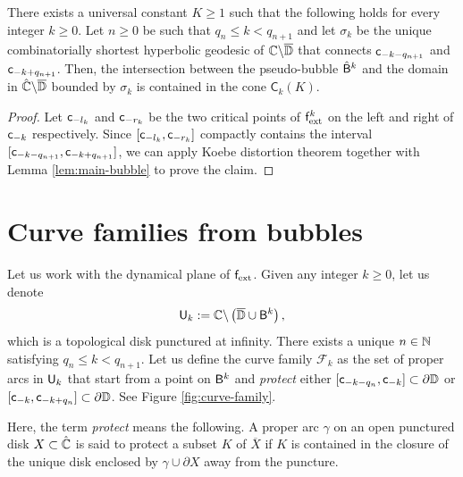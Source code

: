 \documentclass{amsart}
\begin{document}
\begin{lemma}
\label{lem:control-near-roots}
    There exists a universal constant $K\geq 1$ such that the following holds for every integer $k \geq 0$. 
    Let $n \geq 0$ be such that $q_n \leq k < q_{n+1}$ and let $\sigma_k$ be the unique combinatorially shortest hyperbolic geodesic of $\mathbb{C} \backslash \overline{\mathbb{D}}$ that connects $\mathsf{c}_{-k-q_{n+1}}$ and $\mathsf{c}_{-k+q_{n+1}}$. 
    Then, the intersection between the pseudo-bubble $\hat{\mathsf{B}}^k$ and the domain in $\hat{\mathbb{C}} \backslash \overline{\mathbb{D}}$ bounded by $\sigma_k$ is contained in the cone $\mathsf{C}_k(K)$. 
\end{lemma}

\begin{proof}
    Let $\mathsf{c}_{-l_k}$ and $\mathsf{c}_{-r_k}$ be the two critical points of $\mathsf{f}_{\textnormal{ext}}^k$ on the left and right of $\mathsf{c}_{-k}$ respectively. 
    Since $[\mathsf{c}_{-l_k},\mathsf{c}_{-r_k}]$ compactly contains the interval $[\mathsf{c}_{-k-q_{n+1}}, \mathsf{c}_{-k+q_{n+1}}]$, we can apply Koebe distortion theorem together with Lemma \ref{lem:main-bubble} to prove the claim.
\end{proof}


\section{Curve families from bubbles}
\label{sec:curve-families}

Let us work with the dynamical plane of $\mathsf{f}_{\textnormal{ext}}$. 
Given any integer $k \geq 0$, let us denote
\[
    \mathsf{U}_k := \mathbb{C} \backslash \left( \overline{\mathbb{D}} \cup \mathsf{B}^k \right),
\]
which is a topological disk punctured at infinity. 
There exists a unique $n \in \mathbb{N}$ satisfying $q_{n} \leq k < q_{n+1}$.
Let us define the curve family $\mathcal{F}_k$ as the set of proper arcs in $\mathsf{U}_k$ that start from a point on $\mathsf{B}^k$ and \emph{protect} either $[\mathsf{c}_{-k-q_n},\mathsf{c}_{-k}] \subset \partial \mathbb{D}$ or $[\mathsf{c}_{-k},\mathsf{c}_{-k+q_n}] \subset \partial \mathbb{D}$.
See Figure \ref{fig:curve-family}.

Here, the term \emph{protect} means the following.
A proper arc $\gamma$ on an open punctured disk $X \subset \hat{\mathbb{C}}$ is said to protect a subset $K$ of $\overline{X}$ if $K$ is contained in the closure of the unique disk enclosed by $\gamma \cup \partial X$ away from the puncture.
\end{document}
